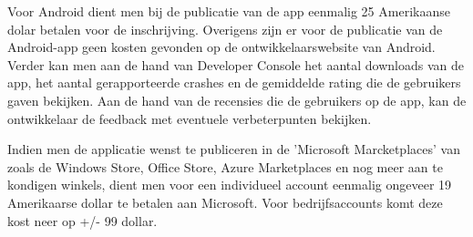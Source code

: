 Voor Android dient men bij de publicatie van de app \cite{getstartedwithpublishingandroiddevelopers2017} eenmalig 25 Amerikaanse dolar betalen voor de inschrijving.
Overigens zijn er voor de publicatie van de Android-app geen kosten gevonden op de ontwikkelaarswebsite van Android.
Verder kan men aan de hand van Developer Console het aantal downloads van de app, het aantal gerapporteerde crashes en de gemiddelde rating die de gebruikers gaven bekijken.
Aan de hand van de recensies die de gebruikers op de app, kan de ontwikkelaar de feedback met eventuele verbeterpunten bekijken.

Indien men de applicatie wenst te publiceren in de 'Microsoft Marcketplaces' van \cite{registerasanappdeveloper2017}
 zoals de Windows Store, Office Store, Azure Marketplaces en nog meer aan te kondigen winkels, dient men voor een individueel account
 eenmalig ongeveer 19 Amerikaarse dollar te betalen aan Microsoft. Voor bedrijfsaccounts komt deze kost neer op +/- 99 dollar.
